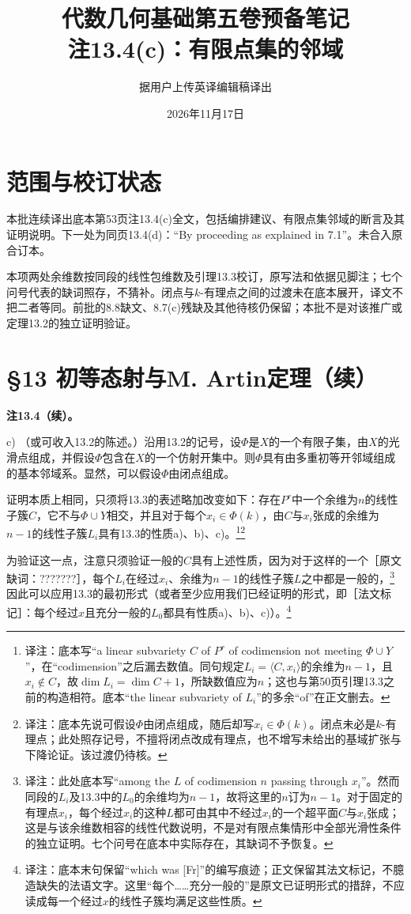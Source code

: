 \documentclass[openany,fontset=fandol]{ctexbook}
\newcommand{\note}[1]{\footnote{译注：#1}}
\begin{document}
\title{代数几何基础第五卷预备笔记\\注13.4(c)：有限点集的邻域}
\author{据用户上传英译编辑稿译出}
\date{2026年11月17日}
\maketitle
\chapter*{范围与校订状态}
本批连续译出底本第53页注13.4(c)全文，包括编排建议、有限点集邻域的断言及其证明说明。下一处为同页13.4(d)：“By proceeding as explained in 7.1”。未合入原合订本。

本项两处余维数按同段的线性包维数及引理13.3校订，原写法和依据见脚注；七个问号代表的缺词照存，不猜补。闭点与$k$-有理点之间的过渡未在底本展开，译文不把二者等同。前批的8.8缺文、8.7(c)残缺及其他待核仍保留；本批不是对该推广或定理13.2的独立证明验证。
\chapter*{§13 初等态射与M. Artin定理（续）}
\noindent\textbf{注13.4（续）。}

\noindent c) （或可收入13.2的陈述。）沿用13.2的记号，设$\Phi$是$X$的一个有限子集，由$X$的光滑点组成，并假设$\Phi$包含在$X$的一个仿射开集中。则$\Phi$具有由多重初等开邻域组成的基本邻域系。显然，可以假设$\Phi$由闭点组成。

证明本质上相同，只须将13.3的表述略加改变如下：存在$P^r$中一个余维为$n$的线性子簇$C$，它不与$\Phi\cup Y$相交，并且对于每个$x_i\in\Phi(k)$，由$C$与$x_i$张成的余维为$n-1$的线性子簇$L_i$具有13.3的性质a)、b)、c)。\note{底本写“a linear subvariety $C$ of $P^r$ of codimension not meeting $\Phi\cup Y$”，在“codimension”之后漏去数值。同句规定$L_i=\langle C,x_i\rangle$的余维为$n-1$，且$x_i\notin C$，故$\dim L_i=\dim C+1$，所缺数值应为$n$；这也与第50页引理13.3之前的构造相符。底本“the linear subvariety of $L_i$”的多余“of”在正文删去。}\note{底本先说可假设$\Phi$由闭点组成，随后却写$x_i\in\Phi(k)$。闭点未必是$k$-有理点；此处照存记号，不擅将闭点改成有理点，也不增写未给出的基域扩张与下降论证。该过渡仍待核。}

为验证这一点，注意只须验证一般的$C$具有上述性质，因为对于这样的一个［原文缺词：???????］，每个$L_i$在经过$x_i$、余维为$n-1$的线性子簇$L$之中都是一般的，\note{此处底本写“among the $L$ of codimension $n$ passing through $x_i$”。然而同段的$L_i$及13.3中的$L_0$的余维均为$n-1$，故将这里的$n$订为$n-1$。对于固定的有理点$x_i$，每个经过$x_i$的这种$L$都可由其中不经过$x_i$的一个超平面$C$与$x_i$张成；这是与该余维数相容的线性代数说明，不是对有限点集情形中全部光滑性条件的独立证明。七个问号在底本中实际存在，其缺词不予恢复。}因此可以应用13.3的最初形式（或者至少应用我们已经证明的形式，即［法文标记］：每个经过$x$且充分一般的$L_0$都具有性质a)、b)、c)）。\note{底本末句保留“which was [Fr]”的编写痕迹；正文保留其法文标记，不臆造缺失的法语文字。这里“每个……充分一般的”是原文已证明形式的措辞，不应读成每一个经过$x$的线性子簇均满足这些性质。}
\end{document}
